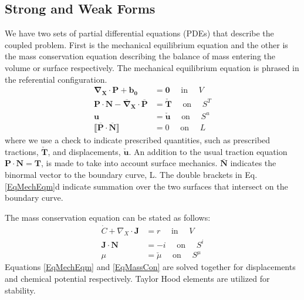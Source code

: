 \documentclass[12pt,3p]{article}
\numberwithin{equation}{section}
\begin{document}
\subsection{Strong and Weak Forms}
\vspace{-1ex}
We have two sets of partial differential equations (PDEs) that describe the coupled problem. First is the mechanical equilibrium equation and the other is the mass conservation equation describing the balance of mass entering the volume or surface respectively. The mechanical equilibrium equation is phrased in the referential configuration. 
\begin{subequations}\label{EqMechEqm}
\begin{align}
\bm{\nabla}_{\boldsymbol{X}} \cdot \mathbf{P}+\mathbf{b}_{\mathbf{0}} &= \mathbf{0} \quad \text { in } \quad V\\
\mathbf{P} \cdot \mathbf{N}-\overline{\boldsymbol{\nabla}}_{\boldsymbol{X}} \cdot \overline{\mathbf{P}}&=\check{\mathbf{T}} \quad \text { on } \quad S^{T}\\
\mathbf{u} &= \check{\mathbf{u}} \quad \text { on } \quad S^{u}\\
\llbracket \overline{\mathbf{P}} \cdot \overline{\mathbf{N}} \rrbracket &=0 \quad \text { on } \quad L
\end{align}
\end{subequations}
where we use a check to indicate prescribed quantities, such as prescribed tractions, $\mathbf{\check{T}}$,  and displacements, $\mathbf{\check{u}}$. An addition to the usual traction equation $\mathbf{P} \cdot \mathbf{N} = \mathbf{T}$, is made to take into account surface mechanics. $\bar{\mathbf{N}}$ indicates the binormal vector to the boundary curve, L. The double brackets in Eq.\ref{EqMechEqm}d indicate summation over the two surfaces that intersect on the boundary curve.

The mass conservation equation can be stated as follows: 
\begin{subequations}\label{EqMassCon}
\begin{align}
\dot{C}+\nabla_{X} \cdot \mathbf{J} &=r \quad \text { in } \quad V \\
\mathbf{J} \cdot \mathbf{N} &=-i \quad \text { on } \quad S^{i} \\
\mu &= \check{\mu} \quad \text { on } \quad S^{\mu}
\end{align}
\end{subequations}
Equations \ref{EqMechEqm} and \ref{EqMassCon} are solved together for displacements and chemical potential respectively. Taylor Hood elements are utilized for stability.  
\end{document}
